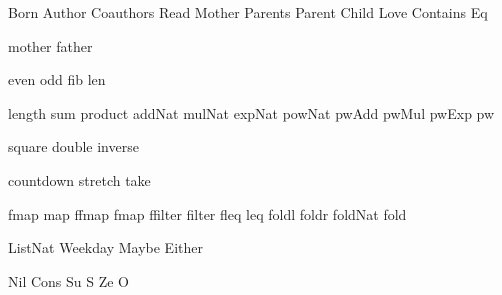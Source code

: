 
\DefRel Born
\DefRel Author
\DefRel Coauthors
\DefRel Read
\DefRel Mother
\DefRel Parents
\DefRel Parent
\DefRel Child
\DefRel Love
\DefRel Contains
\DefRel Eq

\DefFun mother
\DefFun father

\DefFun even
\DefFun odd
\DefFun fib
\DefFun len

\DefFpf length
\DefFpf sum
\DefFpf product
\DefFpf addNat
\DefFpf mulNat
\DefFpf expNat
\DefFpf powNat
\DefFpf pwAdd
\DefFpf pwMul
\DefFpf pwExp
\DefFpf pw

\DefFpf square
\DefFpf double
\DefFpf inverse

\DefFpf countdown
\DefFpf stretch
\DefFpf take

\DefFPF fmap    map
\DefFPF ffmap   fmap
\DefFPF ffilter filter
\DefFPF fleq    leq
\DefFpf foldl
\DefFpf foldr
\DefFpf foldNat
\DefFpf fold

\DefType ListNat
\DefType Weekday
\DefType Maybe
\DefType Either

\DefCons Nil
\DefCons Cons
\DefCONS Su S
\DefCONS Ze O


\def\bla{\mathrm{bla}}
\def\blu{\mathrm{blu}}

\def\persons{{\cal P}}
\let\pers=\persons

\def\euclid{\algorithmstylize{Euclid}}%

\def\Smile{\rel{\woohoo}}
\def\Frown{\rel{\boohoo}}

\def\oddAs#1{A_{[#1]}}

